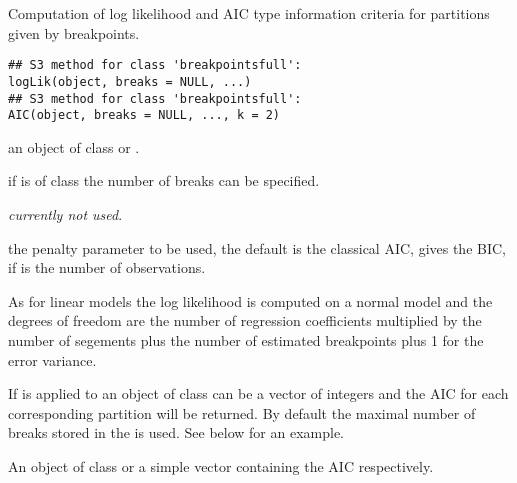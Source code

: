 \begin{Description}\relax
Computation of log likelihood and AIC type information criteria
for partitions given by breakpoints.\end{Description}
\begin{Usage}
\begin{verbatim}
## S3 method for class 'breakpointsfull':
logLik(object, breaks = NULL, ...)
## S3 method for class 'breakpointsfull':
AIC(object, breaks = NULL, ..., k = 2)
\end{verbatim}
\end{Usage}
\begin{Arguments}
\begin{ldescription}
\item[\code{object}] an object of class  or .
\item[\code{breaks}] if  is of class  the
number of breaks can be specified.
\item[\code{...}] \emph{currently not used}.
\item[\code{k}] the penalty parameter to be used, the default 
is the classical AIC,  gives the BIC, if 
is the number of observations.
\end{ldescription}
\end{Arguments}
\begin{Details}\relax
As for linear models the log likelihood is computed on a normal model and
the degrees of freedom are the number of regression coefficients multiplied
by the number of segements plus the number of estimated breakpoints plus
1 for the error variance.

If  is applied to an object of class 
 can be a vector of integers and the AIC for each corresponding
partition will be returned. By default the maximal number of breaks stored
in the  is used. See below for an example.\end{Details}
\begin{Value}
An object of class  or a simple vector containing
the AIC respectively.\end{Value}
\begin{SeeAlso}\relax
{}\end{SeeAlso}

